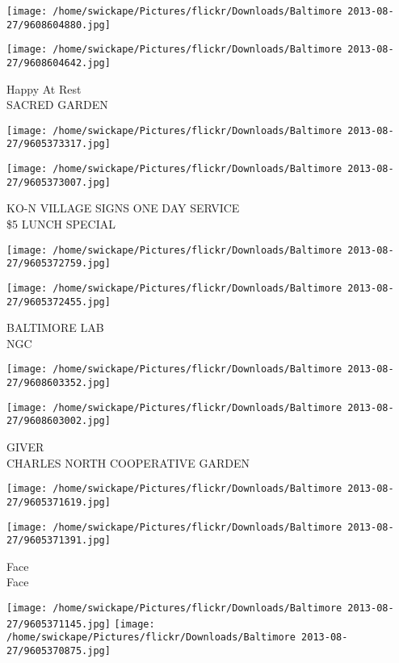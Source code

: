 \documentclass[10pt,letterpaper]{article}
\begin{document}
\texttt{[image: /home/swickape/Pictures/flickr/Downloads/Baltimore 2013-08-27/9608604880.jpg]}

\vspace{0.25in}
\texttt{[image: /home/swickape/Pictures/flickr/Downloads/Baltimore 2013-08-27/9608604642.jpg]}

Happy At Rest\\
SACRED GARDEN
\pagebreak

\texttt{[image: /home/swickape/Pictures/flickr/Downloads/Baltimore 2013-08-27/9605373317.jpg]}

\vspace{0.25in}
\texttt{[image: /home/swickape/Pictures/flickr/Downloads/Baltimore 2013-08-27/9605373007.jpg]}

KO{-}N VILLAGE SIGNS ONE DAY SERVICE\\
\$5 LUNCH SPECIAL
\pagebreak

\texttt{[image: /home/swickape/Pictures/flickr/Downloads/Baltimore 2013-08-27/9605372759.jpg]}

\vspace{0.25in}
\texttt{[image: /home/swickape/Pictures/flickr/Downloads/Baltimore 2013-08-27/9605372455.jpg]}

BALTIMORE LAB\\
NGC
\pagebreak

\texttt{[image: /home/swickape/Pictures/flickr/Downloads/Baltimore 2013-08-27/9608603352.jpg]}

\vspace{0.25in}
\texttt{[image: /home/swickape/Pictures/flickr/Downloads/Baltimore 2013-08-27/9608603002.jpg]}

GIVER\\
CHARLES NORTH COOPERATIVE GARDEN
\pagebreak

\texttt{[image: /home/swickape/Pictures/flickr/Downloads/Baltimore 2013-08-27/9605371619.jpg]}

\vspace{0.25in}
\texttt{[image: /home/swickape/Pictures/flickr/Downloads/Baltimore 2013-08-27/9605371391.jpg]}

Face\\
Face
\pagebreak

\texttt{[image: /home/swickape/Pictures/flickr/Downloads/Baltimore 2013-08-27/9605371145.jpg]}
\texttt{[image: /home/swickape/Pictures/flickr/Downloads/Baltimore 2013-08-27/9605370875.jpg]}
\end{document}
